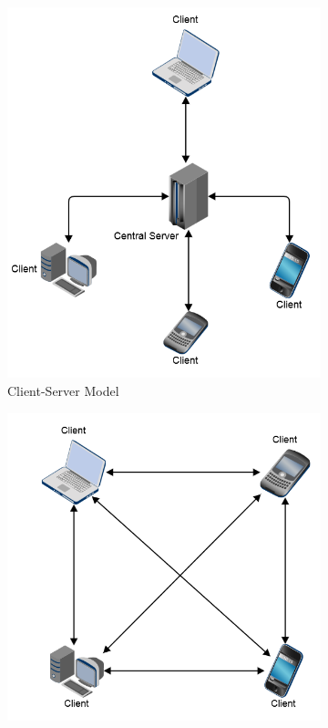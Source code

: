 \begin{figure}[!htbp]
	\centering
	\begin{subfigure}[b]{0.4\textwidth}
		\includegraphics[width=\textwidth]{"System Diagram/client_server_simpler"}
		\caption{Client-Server Model}
		\label{subfig:client-server}
	\end{subfigure}
	\begin{subfigure}[b]{0.4\textwidth}
		\includegraphics[width=\textwidth]{"System Diagram/peer_to_peer"}

\end{subfigure}
\end{figure}
